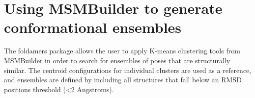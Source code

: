 \documentclass[letterpaper,12pt,english,openany,oneside]{sphinxmanual}
\begin{document}
\section{Using MSMBuilder to generate conformational ensembles}
\label{\detokenize{ensembles:using-msmbuilder-to-generate-conformational-ensembles}}
The foldamers package allows the user to apply K-means clustering tools from MSMBuilder in order to search for ensembles of poses that are structurally similar.  The centroid configurations for individual clusters are used as a reference, and ensembles are defined by including all structures that fall below an RMSD positions threshold (\textless{}2 Angstroms).

\label{\detokenize{ensembles:module-ensembles.cluster}}
\end{document}
